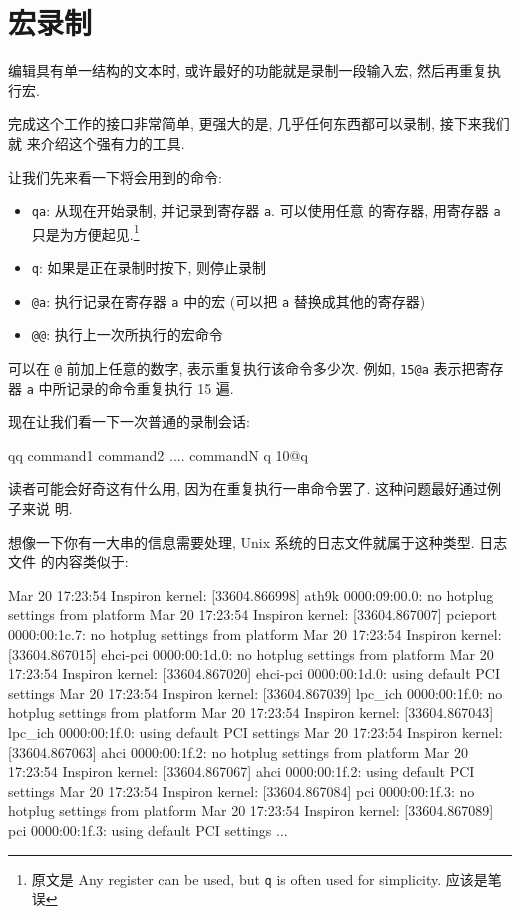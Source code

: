 \section{宏录制}
\label{sec:using_macro_recording}

编辑具有单一结构的文本时, 或许最好的功能就是录制一段输入宏, 然后再重复执行宏.

完成这个工作的接口非常简单, 更强大的是, 几乎任何东西都可以录制, 接下来我们就
来介绍这个强有力的工具.

让我们先来看一下将会用到的命令:
\begin{itemize}
    \item \texttt{qa}: 从现在开始录制, 并记录到寄存器 \texttt{a}. 可以使用任意
        的寄存器, 用寄存器 \texttt{a} 只是为方便起见.\footnote{原文是 Any
            register can be used, but \texttt{q} is often used for simplicity.
        应该是笔误}
    \item \texttt{q}: 如果是正在录制时按下, 则停止录制
    \item \texttt{@a}: 执行记录在寄存器 \texttt{a} 中的宏 (可以把 \texttt{a}
        替换成其他的寄存器)
    \item \texttt{@@}: 执行上一次所执行的宏命令
\end{itemize}
可以在 \texttt{@} 前加上任意的数字, 表示重复执行该命令多少次. 例如,
\texttt{15@a} 表示把寄存器 \texttt{a} 中所记录的命令重复执行 15 遍.

现在让我们看一下一次普通的录制会话:
\begin{vimcode}
qq
command1
command2
....
commandN
q
10@q
\end{vimcode}
读者可能会好奇这有什么用, 因为在重复执行一串命令罢了. 这种问题最好通过例子来说
明.

想像一下你有一大串的信息需要处理, Unix 系统的日志文件就属于这种类型. 日志文件
的内容类似于:
\begin{vimcode}
Mar 20 17:23:54 Inspiron kernel: [33604.866998] ath9k 0000:09:00.0: no hotplug settings from platform
Mar 20 17:23:54 Inspiron kernel: [33604.867007] pcieport 0000:00:1c.7: no hotplug settings from platform
Mar 20 17:23:54 Inspiron kernel: [33604.867015] ehci-pci 0000:00:1d.0: no hotplug settings from platform
Mar 20 17:23:54 Inspiron kernel: [33604.867020] ehci-pci 0000:00:1d.0: using default PCI settings
Mar 20 17:23:54 Inspiron kernel: [33604.867039] lpc_ich 0000:00:1f.0: no hotplug settings from platform
Mar 20 17:23:54 Inspiron kernel: [33604.867043] lpc_ich 0000:00:1f.0: using default PCI settings
Mar 20 17:23:54 Inspiron kernel: [33604.867063] ahci 0000:00:1f.2: no hotplug settings from platform
Mar 20 17:23:54 Inspiron kernel: [33604.867067] ahci 0000:00:1f.2: using default PCI settings
Mar 20 17:23:54 Inspiron kernel: [33604.867084] pci 0000:00:1f.3: no hotplug settings from platform
Mar 20 17:23:54 Inspiron kernel: [33604.867089] pci 0000:00:1f.3: using default PCI settings
...
\end{vimcode}

